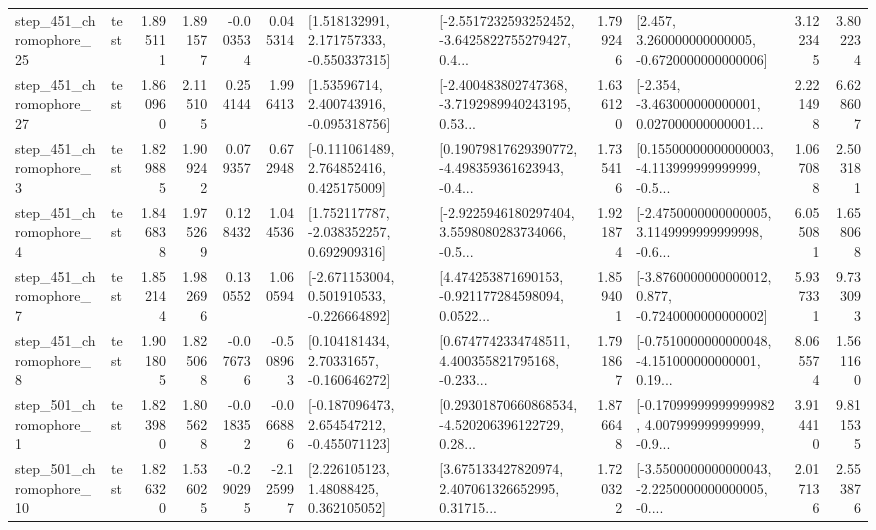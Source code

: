 \begin{tabular}{llrrrrllrlrr}
  step\_451\_chromophore\_25 &      test &      1.895111 &    1.891577 &     -0.003534 &  0.045314 &    [1.518132991, 2.171757333, -0.550337315] &  [-2.5517232593252452, -3.6425822755279427, 0.4... &       1.799246 &    [2.457, 3.260000000000005, -0.6720000000000006] &            3.122345 &          3.802234 \\
  step\_451\_chromophore\_27 &      test &      1.860960 &    2.115105 &      0.254144 &  1.996413 &     [1.53596714, 2.400743916, -0.095318756] &  [-2.400483802747368, -3.7192989940243195, 0.53... &       1.636120 &  [-2.354, -3.463000000000001, 0.027000000000001... &            2.221498 &          6.628607 \\
   step\_451\_chromophore\_3 &      test &      1.829885 &    1.909242 &      0.079357 &  0.672948 &    [-0.111061489, 2.764852416, 0.425175009] &  [0.19079817629390772, -4.498359361623943, -0.4... &       1.735416 &  [0.15500000000000003, -4.113999999999999, -0.5... &            1.067088 &          2.503181 \\
   step\_451\_chromophore\_4 &      test &      1.846838 &    1.975269 &      0.128432 &  1.044536 &    [1.752117787, -2.038352257, 0.692909316] &  [-2.9225946180297404, 3.5598080283734066, -0.5... &       1.921874 &  [-2.4750000000000005, 3.1149999999999998, -0.6... &            6.055081 &          1.658068 \\
   step\_451\_chromophore\_7 &      test &      1.852144 &    1.982696 &      0.130552 &  1.060594 &   [-2.671153004, 0.501910533, -0.226664892] &  [4.474253871690153, -0.921177284598094, 0.0522... &       1.859401 &  [-3.8760000000000012, 0.877, -0.7240000000000002] &            5.937331 &          9.733093 \\
   step\_451\_chromophore\_8 &      test &      1.901805 &    1.825068 &     -0.076736 & -0.508963 &     [0.104181434, 2.70331657, -0.160646272] &  [0.6747742334748511, 4.400355821795168, -0.233... &       1.791867 &  [-0.7510000000000048, -4.151000000000001, 0.19... &            8.065574 &          1.561160 \\
   step\_501\_chromophore\_1 &      test &      1.823980 &    1.805628 &     -0.018352 & -0.066886 &   [-0.187096473, 2.654547212, -0.455071123] &  [0.29301870660868534, -4.520206396122729, 0.28... &       1.876648 &  [-0.17099999999999982, 4.007999999999999, -0.9... &            3.914410 &          9.811535 \\
  step\_501\_chromophore\_10 &      test &      1.826320 &    1.536025 &     -0.290295 & -2.125997 &      [2.226105123, 1.48088425, 0.362105052] &  [3.675133427820974, 2.407061326652995, 0.31715... &       1.720322 &  [-3.5500000000000043, -2.2250000000000005, -0.... &            2.017136 &          2.553876 \\

\end{tabular}
